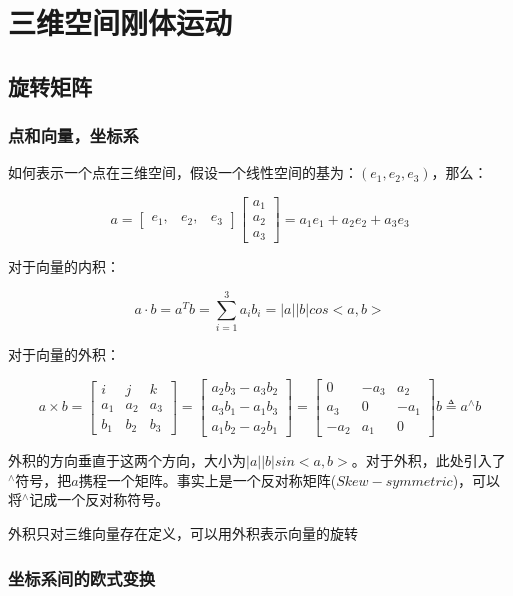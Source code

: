 \chapter{三维空间刚体运动}

\section{旋转矩阵} 

\subsection{点和向量，坐标系}

    如何表示一个点在三维空间，假设一个线性空间的基为：$(e_1, e_2, e_3)$，那么：

$$
a = 
\begin{bmatrix}
e_1, & e_2, & e_3
\end{bmatrix}
\begin{bmatrix}
a_1 \\
a_2 \\
a_3 
\end{bmatrix} = a_1e_1 + a_2e_2 + a_3e_3
$$

    对于向量的内积：

$$
    a \cdot b = a^Tb = \sum_{i = 1}^3{a_ib_i} = |a||b|cos<a, b>
$$

    对于向量的外积：

$$
a \times b = 
\begin{bmatrix}
i & j & k \\
a_1 & a_2 & a_3 \\
b_1 & b_2 & b_3 
\end{bmatrix} = 
\begin{bmatrix}
a_2b_3 - a_3b_2 \\
a_3b_1 - a_1b_3 \\
a_1b_2 - a_2b_1
\end{bmatrix} = 
\begin{bmatrix}
0 & -a_3 & a_2 \\
a_3 & 0 & -a_1 \\
-a_2 & a_1 & 0
\end{bmatrix}b \triangleq a^\land b
$$

    外积的方向垂直于这两个方向，大小为$|a||b|sin<a, b>$。对于外积，此处引入了${}^\land$符号，把$a$携程一个矩阵。事实上是一个反对称矩阵($Skew-symmetric$)，可以将${}^\land$记成一个反对称符号。

    外积只对三维向量存在定义，可以用外积表示向量的旋转

\subsection{坐标系间的欧式变换}

